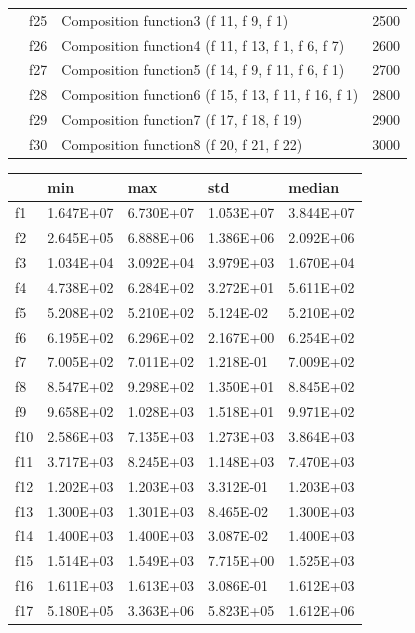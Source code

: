\begin{table}[]
\begin{tabular}{llll}
    & f25 & Composition function3 (f 11, f 9, f 1) & 2500 \\
    & f26 & Composition function4 (f 11, f 13, f 1, f 6, f 7) & 2600 \\
    & f27 & Composition function5 (f 14, f 9, f 11, f 6, f 1) & 2700 \\
    & f28 & Composition function6 (f 15, f 13, f 11, f 16, f 1) & 2800 \\
    & f29 & Composition function7 (f 17, f 18, f 19) & 2900 \\
    & f30 & Composition function8 (f 20, f 21, f 22) & 3000
\end{tabular}
\end{table}


\begin{table}[]
\begin{tabular}{lllll}
    & \textbf{min}       & \textbf{max}       & \textbf{std}       & \textbf{median}    \\ \hline
f1  & 1.647E+07 & 6.730E+07 & 1.053E+07 & 3.844E+07 \\
f2  & 2.645E+05 & 6.888E+06 & 1.386E+06 & 2.092E+06 \\
f3  & 1.034E+04 & 3.092E+04 & 3.979E+03 & 1.670E+04 \\
f4  & 4.738E+02 & 6.284E+02 & 3.272E+01 & 5.611E+02 \\
f5  & 5.208E+02 & 5.210E+02 & 5.124E-02 & 5.210E+02 \\
f6  & 6.195E+02 & 6.296E+02 & 2.167E+00 & 6.254E+02 \\
f7  & 7.005E+02 & 7.011E+02 & 1.218E-01 & 7.009E+02 \\
f8  & 8.547E+02 & 9.298E+02 & 1.350E+01 & 8.845E+02 \\
f9  & 9.658E+02 & 1.028E+03 & 1.518E+01 & 9.971E+02 \\
f10 & 2.586E+03 & 7.135E+03 & 1.273E+03 & 3.864E+03 \\
f11 & 3.717E+03 & 8.245E+03 & 1.148E+03 & 7.470E+03 \\
f12 & 1.202E+03 & 1.203E+03 & 3.312E-01 & 1.203E+03 \\
f13 & 1.300E+03 & 1.301E+03 & 8.465E-02 & 1.300E+03 \\
f14 & 1.400E+03 & 1.400E+03 & 3.087E-02 & 1.400E+03 \\
f15 & 1.514E+03 & 1.549E+03 & 7.715E+00 & 1.525E+03 \\
f16 & 1.611E+03 & 1.613E+03 & 3.086E-01 & 1.612E+03 \\
f17 & 5.180E+05 & 3.363E+06 & 5.823E+05 & 1.612E+06 \\

\end{tabular}
\end{table}
